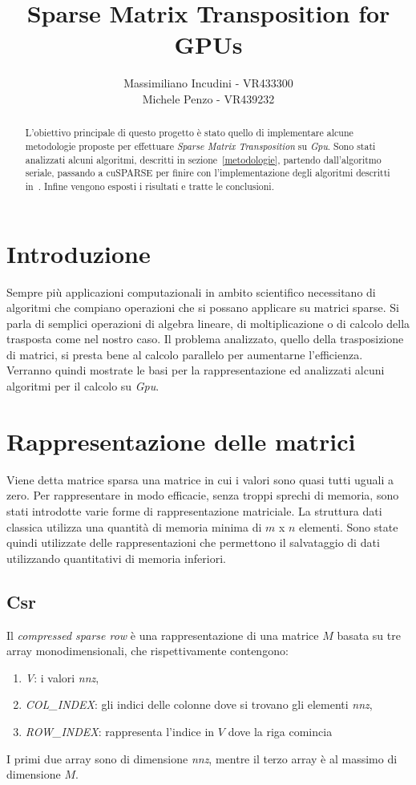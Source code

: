\documentclass[]{IEEEtran}
\title{Sparse Matrix Transposition for GPUs}
\author{Massimiliano Incudini - VR433300\\Michele Penzo - VR439232}
\begin{document}
\maketitle

\begin{abstract}
	L'obiettivo principale di questo progetto è stato quello di implementare alcune metodologie proposte per effettuare \textit{Sparse Matrix Transposition} su \textit{Gpu}.
	Sono stati analizzati alcuni algoritmi, descritti in sezione~\ref{metodologie}, partendo dall'algoritmo seriale, passando a cuSPARSE per finire con l'implementazione degli algoritmi descritti in~\cite{parallelTrans}.
	Infine vengono esposti i risultati e tratte le conclusioni.
\end{abstract}


\section{Introduzione}
\label{introduzione}
	Sempre più applicazioni computazionali in ambito scientifico necessitano di algoritmi che compiano operazioni che si possano applicare su matrici sparse. Si parla di semplici operazioni di algebra lineare, di moltiplicazione o di calcolo della trasposta come nel nostro caso.\newline
	Il problema analizzato, quello della trasposizione di matrici, si presta bene al calcolo parallelo per aumentarne l'efficienza. Verranno quindi mostrate le basi per la rappresentazione ed analizzati alcuni algoritmi per il calcolo su \textit{Gpu}.


\section{Rappresentazione delle matrici}
\label{rappresentazione}
	Viene detta matrice sparsa una matrice in cui i valori sono quasi tutti uguali a zero. Per rappresentare in modo efficacie, senza troppi sprechi di memoria, sono stati introdotte varie forme di rappresentazione matriciale. La struttura dati classica utilizza una quantità di memoria minima di $ m $ x $ n $ elementi.\newline
	Sono state quindi utilizzate delle rappresentazioni che permettono il salvataggio di dati utilizzando quantitativi di memoria inferiori.
	
	\subsection{Csr}
	\label{csr}
	Il \textit{compressed sparse row} è una rappresentazione di una matrice $ M $ basata su tre array monodimensionali, che rispettivamente contengono:
	\begin{enumerate}
		\item \textit{V}: i valori \textit{nnz},
		\item \textit{COL\_INDEX}: gli indici delle colonne dove si trovano gli elementi \textit{nnz},
		\item \textit{ROW\_INDEX}: rappresenta l'indice in $ V $ dove la riga comincia
	\end{enumerate}
	I primi due array sono di dimensione \textit{nnz}, mentre il terzo array è al massimo di dimensione $ M $.
	
\end{document}
